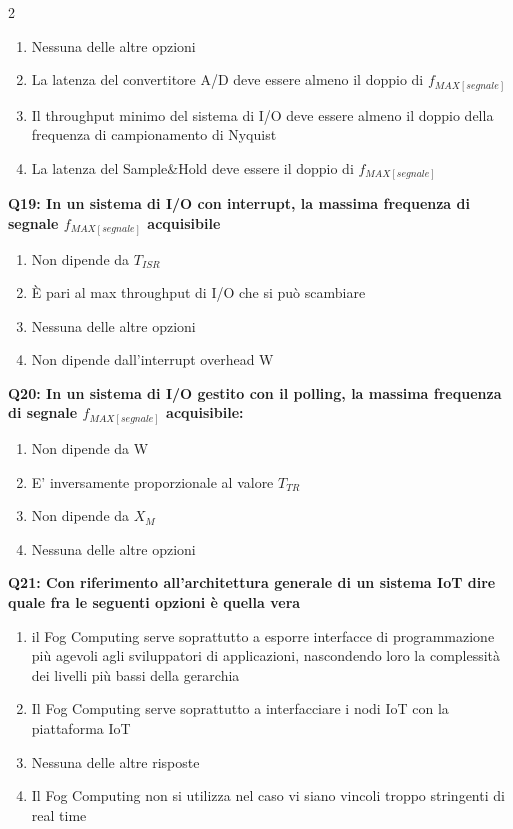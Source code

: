 \documentclass[10pt]{article}
\begin{document}
\begin{multicols}{2}
\begin{enumerate}[label=\arabic*.]
\item Nessuna delle altre opzioni
\item La latenza del convertitore A/D deve essere almeno il doppio di $f_{MAX[segnale]}$
\item Il throughput minimo del sistema di I/O deve essere almeno il doppio della frequenza di campionamento di Nyquist
\item La latenza del Sample\&Hold deve essere il doppio di $f_{MAX[segnale]}$
\end{enumerate}
\textbf{Q19: In un sistema di I/O con interrupt, la massima frequenza di segnale $f_{MAX[segnale]}$ acquisibile}

\begin{enumerate}[label=\arabic*.]
\item Non dipende da $T_{ISR}$
\item È pari al max throughput di I/O che si può scambiare
\item Nessuna delle altre opzioni
\item Non dipende dall’interrupt overhead W
\end{enumerate}
\textbf{Q20: In un sistema di I/O gestito con il polling, la massima frequenza di segnale $f_{MAX[segnale]}$ acquisibile:}

\begin{enumerate}[label=\arabic*.]
\item Non dipende da W
\item E' inversamente proporzionale al valore $T_{TR}$
\item Non dipende da $X_M$
\item Nessuna delle altre opzioni
\end{enumerate}
\textbf{Q21: Con riferimento all’architettura generale di un sistema IoT dire quale fra le seguenti opzioni è quella vera}

\begin{enumerate}[label=\arabic*.]
\item il Fog Computing serve soprattutto a esporre interfacce di programmazione più agevoli agli sviluppatori di applicazioni, nascondendo loro la complessità dei livelli più bassi della gerarchia
\item Il Fog Computing serve soprattutto a interfacciare i nodi IoT con la piattaforma IoT
\item Nessuna delle altre risposte
\item Il Fog Computing non si utilizza nel caso vi siano vincoli troppo stringenti di real time
\end{enumerate}
\end{multicols}
\end{document}
